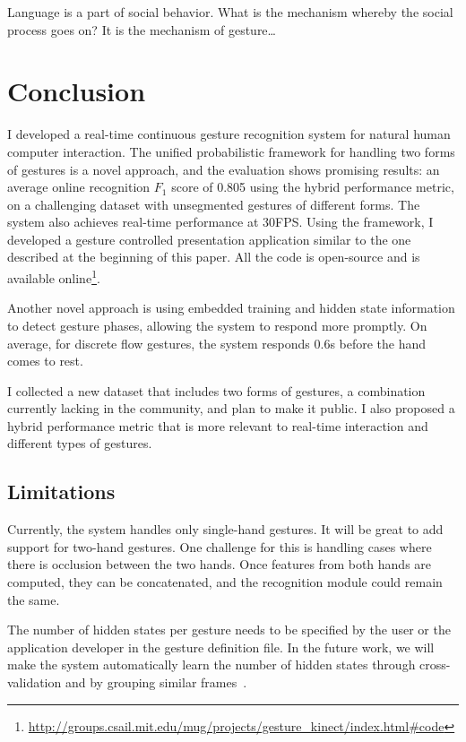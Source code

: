 \begin{savequote}
Language is a part of social behavior. What is the mechanism whereby the social
process goes on? It is the mechanism of gesture\ldots
{}
\end{savequote}
\chapter{Conclusion}
I developed a real-time continuous gesture recognition system for natural
human computer interaction. The
unified probabilistic framework for handling two forms of gestures is a novel
approach, and the evaluation shows promising results: an
average online recognition $F_1$ score of 0.805 using the hybrid performance
metric, on a challenging dataset with unsegmented gestures of different forms.
The system also achieves real-time performance at 30FPS. Using the framework, I
developed a gesture controlled presentation application similar to the one described at the beginning of this paper. All the code is open-source
and is available
online\footnote{\url{http://groups.csail.mit.edu/mug/projects/gesture_kinect/index.html\#code}}.

Another novel approach is using embedded training and hidden state information
to detect gesture phases, allowing the system to respond more promptly. On
average, for discrete flow gestures, the system responds 0.6s before the hand comes to
rest. 

I collected a new dataset that includes two forms of gestures, a
combination currently lacking in the community, and plan to make it
public. I also proposed a hybrid performance metric
that is more relevant to real-time interaction and different types of gestures.

\section{Limitations}
Currently, the system handles only single-hand gestures. It will be great
to add support for two-hand gestures. One challenge for this is handling
cases where there is occlusion between the two hands. Once features from both
hands are computed, they can be concatenated, and the recognition module could
remain the same.

The number of hidden states per gesture needs to be specified by the user or the
application developer in the gesture definition file. In the future work, we
will make the system automatically learn the number of hidden states through
cross-validation and by grouping similar frames~\cite{song13}.

